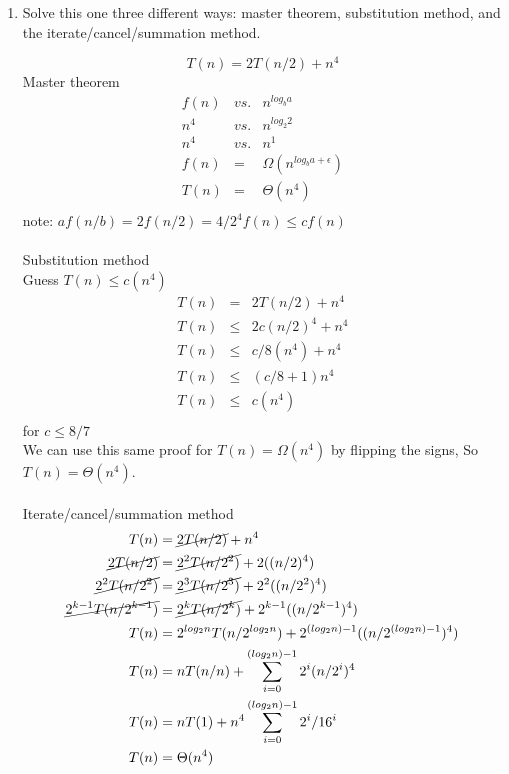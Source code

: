 \documentclass{article}
\begin{document}
    \begin{enumerate}
    \item
    
      Solve this one three different ways:  master theorem,
      substitution method, and the iterate/cancel/summation method.
    
      \[T(n) = 2T(n/2) + n^4\]
      Master theorem \\
      \begin{eqnarray*}
      f(n) &vs.& n^{log_b a} \\
      n^4 &vs.& n^{log_2 2} \\
      n^4 &vs.& n^1 \\
      f(n) &=& \Omega(n^{log_b a+\epsilon}) \\
      T(n) &=& \Theta(n^4) \\
      \end{eqnarray*}
      note:
      $af(n/b) = 2f(n/2) = 4/2^4f(n) \leq cf(n)$
      \\
      \\
      Substitution method \\
      Guess $T(n) \leq c(n^4)$ \\
      \begin{eqnarray*}
      T(n) &=& 2T(n/2) + n^4 \\
      T(n) &\leq& 2c(n/2)^4 + n^4 \\      
      T(n) &\leq& c/8(n^4) + n^4 \\
      T(n) &\leq& (c/8 + 1)n^4 \\
      T(n) &\leq& c(n^4) \\
      \end{eqnarray*}
      for $c \leq 8/7$ \\
      We can use this same proof for $T(n) = \Omega(n^4)$ by flipping the signs, So $T(n) = \Theta(n^4)$.
\\
\\
      Iterate/cancel/summation method \\

      \begin{align*}
      T(n) &=  \cancel{2T(n/2)} + n^4 \\
      \cancel{2T(n/2)} &=  \cancel{2^2T(n/2^2)} + 2((n/2)^4) \\
      \cancel{2^2T(n/2^2)} &=  \cancel{2^3T(n/2^3)} + 2^2((n/2^2)^4) \\
      \cancel{2^{k-1}T(n/2^{k-1})} &=  \cancel{2^kT(n/2^k)} + 2^{k-1}((n/2^{k-1})^4) \\
      T(n) &= 2^{log_2 n} T(n/2^{log_2 n}) + 2^{(log_2 n) -1}((n/2^{{(log_2 n) -1}})^4) \\
      T(n) &= n T(n/n) + \sum_{i=0}^{(log_2 n)-1}  2^i(n/2^i)^4 \\
      T(n) &= n T(1) + n^4 \sum_{i=0}^{(log_2 n)-1}  2^i/16^i \\
      T(n) &= \Theta( n^4) \\
      \end{align*}
      

\end{enumerate}
\end{document}

